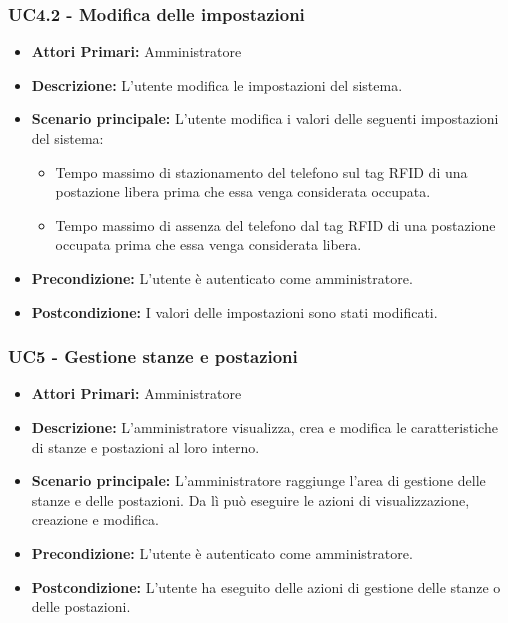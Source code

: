 \subsubsection{ UC4.2 - Modifica delle impostazioni}
\begin{itemize}
	\item\textbf{Attori Primari:} 
	Amministratore
	\item\textbf{Descrizione:} 
	L'utente modifica le impostazioni del sistema.
	\item\textbf{Scenario principale:} 
	L'utente modifica i valori delle seguenti impostazioni del sistema:
	\begin{itemize}
		\item Tempo massimo di stazionamento del telefono sul tag RFID di una postazione libera prima che essa venga considerata occupata.
		\item Tempo massimo di assenza del telefono dal tag RFID di una postazione occupata prima che essa venga considerata libera.
	\end{itemize}
	\item\textbf{Precondizione:} 
	L'utente è autenticato come amministratore.
	\item\textbf{Postcondizione:}
	I valori delle impostazioni sono stati modificati.
\end{itemize}

\subsubsection{ UC5 - Gestione stanze e postazioni}
\begin{itemize}
           	\item\textbf{Attori Primari:} 
           	Amministratore
           	\item\textbf{Descrizione:} 
           	L'amministratore visualizza, crea e modifica le caratteristiche di stanze e postazioni al loro interno.
           	\item\textbf{Scenario principale:} 
           	L'amministratore raggiunge l'area di gestione delle stanze e delle postazioni. Da lì può eseguire le azioni di visualizzazione, creazione e modifica.
           	\item\textbf{Precondizione:} 
           	L'utente è autenticato come amministratore.
           	\item\textbf{Postcondizione:}
           	L'utente ha eseguito delle azioni di gestione delle stanze o delle postazioni.
\end{itemize}

